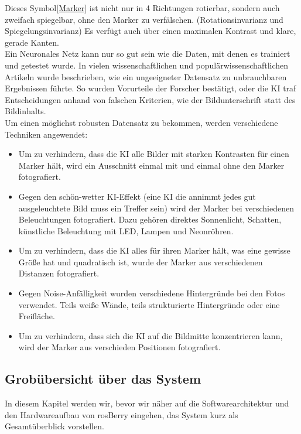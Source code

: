 \documentclass[conference]{IEEEtran}
\begin{document}
Dieses Symbol\ref{Marker} ist nicht nur in 4 Richtungen rotierbar, sondern auch zweifach spiegelbar, ohne den Marker zu verfälschen. (Rotationsinvarianz und Spiegelungsinvarianz)
Es verfügt auch über einen maximalen Kontrast und klare, gerade Kanten.
\\
\noindent
Ein Neuronales Netz kann nur so gut sein wie die Daten, mit denen es trainiert und getestet wurde.
In vielen wissenschaftlichen und populärwissenschaftlichen Artikeln wurde beschrieben, wie ein ungeeigneter Datensatz zu unbrauchbaren Ergebnissen führte.
So wurden Vorurteile der Forscher bestätigt, oder die KI traf Entscheidungen anhand von falschen Kriterien, wie der Bildunterschrift statt des Bildinhalts.
\\
Um einen möglichst robusten Datensatz zu bekommen, werden verschiedene Techniken angewendet:
\begin{itemize}
	\item Um zu verhindern, dass die KI alle Bilder mit starken Kontrasten für einen Marker hält, wird ein Ausschnitt einmal mit und einmal ohne den Marker fotografiert.
	\item Gegen den \glqq schön-wetter KI\grqq-Effekt (eine KI die annimmt jedes gut ausgeleuchtete Bild muss ein Treffer sein) wird der Marker bei verschiedenen Beleuchtungen fotografiert.
	Dazu gehören direktes Sonnenlicht, Schatten, künstliche Beleuchtung mit LED, Lampen und Neonröhren. 
	\item Um zu verhindern, dass die KI alles für ihren Marker hält, was eine gewisse Größe hat und quadratisch ist, wurde der Marker aus verschiedenen Distanzen fotografiert. 
	\item Gegen Noise-Anfälligkeit wurden verschiedene Hintergründe bei den Fotos verwendet. Teils weiße Wände, teils strukturierte Hintergründe oder eine Freifläche. 
	\item Um zu verhindern, dass sich die KI auf die Bildmitte konzentrieren kann, wird der Marker aus verschieden Positionen fotografiert. 
\end{itemize}


\subsection{Grobübersicht über das System}
In diesem Kapitel werden wir, bevor wir näher auf die Softwarearchitektur und den Hardwareaufbau von rosBerry eingehen, das System kurz als Gesamtüberblick vorstellen.
\end{document}
